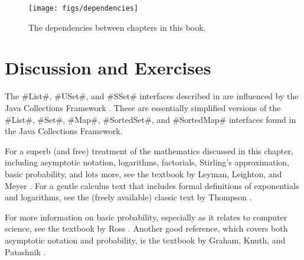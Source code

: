 \begin{figure}
  \begin{center}
    \texttt{[image: figs/dependencies]}
  \end{center}
  \caption{The dependencies between chapters in this book.}
\end{figure}

\section{Discussion and Exercises}

The #List#, #USet#, and #SSet# interfaces described in
 are influenced by the Java Collections Framework
\cite{oracle_collections}.
%
These are essentially simplified versions of
the #List#, #Set#, #Map#, #SortedSet#, and #SortedMap# interfaces found in
the Java Collections Framework.  

For a superb (and free) treatment of the mathematics discussed in this
chapter, including asymptotic notation, logarithms, factorials, Stirling's
approximation, basic probability, and lots more, see the textbook by
Leyman, Leighton, and Meyer \cite{llm11}.  For a gentle calculus text
that includes formal definitions of exponentials and logarithms, see the
(freely available) classic text by Thompson \cite{t14}.

For more information on basic probability, especially as it relates to
computer science, see the textbook by Ross \cite{r01}.  Another good
reference, which covers both asymptotic notation and probability, is
the textbook by Graham, Knuth, and Patashnik \cite{gkp94}.



